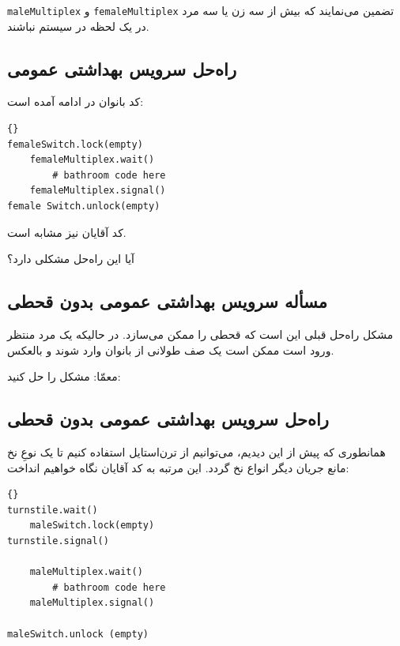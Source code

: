 \documentclass{book}
\newcommand{\clearemptydoublepage}{}%
\begin{document}
    {\tt maleMultiplex} و {\tt femaleMultiplex}  
    تضمین می‌نمایند که بیش از سه زن یا سه مرد در یک لحظه در سیستم نباشند. 


\clearemptydoublepage
\subsection{راه‌حل سرویس بهداشتی عمومی}

    کد بانوان در ادامه آمده است: 

\begin{latin}
\begin{lstlisting}[title=\rl{راه‌حل سرویس بهداشتی عمومی (بانوان)}]{}
femaleSwitch.lock(empty)
    femaleMultiplex.wait()
        # bathroom code here
    femaleMultiplex.signal()
female Switch.unlock(empty)
\end{lstlisting}
\end{latin}

    کد آقایان نیز مشابه است. 

    آیا این راه‌حل مشکلی دارد؟

\clearemptydoublepage
\subsection{مسأله سرویس بهداشتی عمومی بدون قحطی}

    مشکل راه‌حل قبلی این است که قحطی را ممکن می‌سازد. در حالیکه یک مرد منتظر ورود است  ممکن است یک صف طولانی از بانوان وارد شوند و بالعکس. 

    معمّا: مشکل را حل کنید: 


\clearemptydoublepage
\subsection{راه‌حل سرویس بهداشتی عمومی بدون قحطی}

    همانطوری که پیش از این دیدیم، می‌توانیم از ترن‌استایل استفاده کنیم تا یک نوعِ نخ‌ مانع جریان دیگر انواع نخ گردد. این مرتبه به کد آقایان نگاه خواهیم انداخت: 

\begin{latin}
\begin{lstlisting}[title=\rl{راه‌حل سرویس بهداشتی عمومی  بدون قحطی(آقایان)}]{}
turnstile.wait()
    maleSwitch.lock(empty)
turnstile.signal()

    maleMultiplex.wait()
        # bathroom code here
    maleMultiplex.signal()

maleSwitch.unlock (empty)
\end{lstlisting}
\end{latin}
\end{document}
